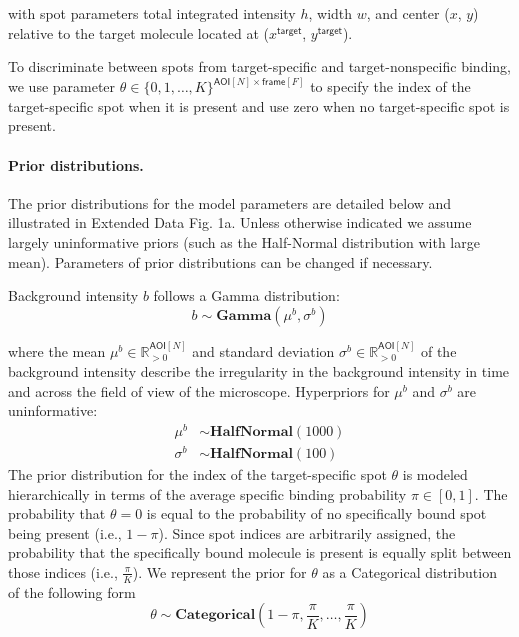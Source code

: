 \noindent
with spot parameters total integrated intensity $h$, width $w$, and center ($x$, $y$) relative to the target molecule located at ($x^\mathsf{target}$, $y^\mathsf{target}$). 
%

To discriminate between spots from target-specific and target-nonspecific binding, we use parameter $\theta \in \{ 0, 1, \dots, K \}^{ \mathsf{AOI}[N] \times \mathsf{frame}[F]}$ to specify the index of the target-specific spot when it is present and use zero when no target-specific spot is present.
%

\paragraph{Prior distributions.} The prior distributions for the model parameters are detailed below and illustrated in Extended Data Fig. 1a. Unless otherwise indicated we assume largely uninformative priors (such as the Half-Normal distribution with large mean). Parameters of prior distributions can be changed if necessary.

Background intensity $b$ follows a Gamma distribution:
%
\begin{equation}
    b \sim \mathbf{Gamma}(\mu^b, \sigma^b)
\end{equation}

\noindent
where the mean $\mu^b \in \mathbb{R}_{>0}^{\mathsf{AOI}[N]}$ and standard deviation $\sigma^b \in \mathbb{R}_{>0}^{\mathsf{AOI}[N]}$ of the background intensity describe the irregularity in the background intensity in time and across the field of view of the microscope. Hyperpriors for $\mu^b$ and $\sigma^b$ are uninformative:
%
\begin{subequations}
\begin{align}
    \mu^b &\sim \mathbf{HalfNormal}(1000) \\
    \sigma^b &\sim \mathbf{HalfNormal}(100)
\end{align}
\end{subequations}
%
The prior distribution for the index of the target-specific spot $\theta$ is modeled hierarchically in terms of the average specific binding probability $\pi \in [0, 1] $. The probability that $\theta = 0$ is equal to the probability of no specifically bound spot being present (i.e., $1-\pi$). Since spot indices are arbitrarily assigned, the probability that the specifically bound molecule is present is equally split between those indices (i.e., $\frac{\pi}{K}$). We represent the prior for $\theta$ as a Categorical distribution of the following form
%
\begin{equation}
    \theta \sim \mathbf{Categorical}\left(1 - \pi, \frac{\pi}{K}, \dots, \frac{\pi}{K}\right)
\end{equation}

